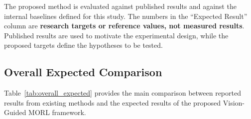 \documentclass[journal]{IEEEtran}
\begin{document}
The proposed method is evaluated against published results and against
the internal baselines defined for this study. The numbers in the
``Expected Result'' column are \textbf{research targets or reference
values, not measured results}. Published results are used to motivate
the experimental design, while the proposed targets define the
hypotheses to be tested.


\subsection{Overall Expected Comparison}

Table~\ref{tab:overall_expected} provides the main comparison between
reported results from existing methods and the expected results of the
proposed Vision-Guided MORL framework.
\end{document}
